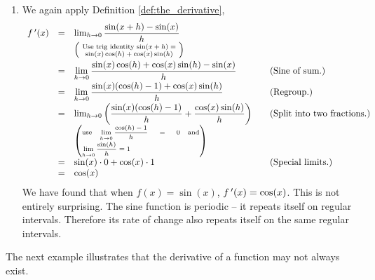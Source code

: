 \begin{example}
\begin{enumerate}
\item We again apply Definition \ref{def:the_derivative},
$$
		\begin{array}{rcll}
		\fp(x) &=& \lim_{h\to 0} \dfrac{\sin(x+h)-\sin(x)}{h} & \\
		&&\left(\text{\scriptsize \parbox{110pt}{\centering Use trig identity $\sin(x+h) = \sin(x)\cos(h)+\cos(x)\sin(h)$}}\right)& \\[0.2cm]
						&=& \ds\lim_{h\to 0} \dfrac{\sin (x)\cos (h)+\cos (x)\sin (h)-\sin (x)}{h} &  \quad\text{(Sine of sum.)}\\[0.2cm]
						&=& \ds\lim_{h\to 0} \dfrac{\sin (x)(\cos (h)-1) + \cos (x)\sin (h)}{h} &  \quad\text{(Regroup.)}\\[0.2cm]
						&=& \lim_{h\to 0} \left(\dfrac{\sin (x)(\cos (h)-1)}{h} + \dfrac{\cos (x)\sin (h)}{h}\right)  &\quad\text{(Split into two fractions.)}\\[0.2cm]
						&&\left(\scriptsize\parbox{130pt}{use $\ds \lim_{h\to 0} \dfrac{\cos (h)-1}{h} = 0$ and $\ds \lim_{h\to 0} \dfrac{\sin (h)}{h} = 1$}\right)\\[0.2cm]
						&=&	\sin (x)\cdot 0 + \cos (x) \cdot 1 & \quad\text{(Special limits.)} \\
						&=& \cos (x)&
		\end{array}
$$
We have found that when $f(x) = \sin (x)$, $f\,'(x) = \cos (x)$. This is not entirely surprising. The sine function is periodic -- it repeats itself on regular intervals. Therefore its rate of change also repeats itself on the same regular intervals.
\end{enumerate}
\end{example}


The next example illustrates that the derivative of a function may not always exist. 

